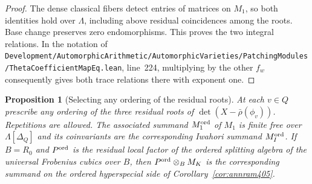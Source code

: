 \documentclass[a4paper,11pt]{article}
\newtheorem{proposition}{Proposition}[section]
\theoremstyle{definition}
\theoremstyle{remark}
\newcommand{\srcloc}[2]{{\small\nolinkurl{#1.lean}}, line~#2}
\numberwithin{equation}{section}
\begin{document}
\begin{proof}
The dense classical fibers detect entries of matrices on
\(M_1\), so both identities hold over \(\Lambda\), including
above residual coincidences among the roots. Base change
preserves zero endomorphisms. This proves the two integral
relations. In the notation of
\srcloc{Development/AutomorphicArithmetic/AutomorphicVarieties/PatchingModules/ThetaCoefficientMapEq}{224},
multiplying by the other \(f_w\) consequently gives both
trace relations there with exponent one.
\end{proof}

\begin{proposition}[Selecting any ordering of the residual roots]\leavevmode
\label{prop:orderedpiece406}
At each \(v\in Q\) prescribe any ordering of the three
residual roots of \(\det(X-\bar\rho(\phi_v))\). Repetitions
are allowed. The associated summand \(M_1^{\rm ord}\) of
\(M_1\) is finite free over \(\Lambda[\Delta_Q]\) and its
coinvariants are the corresponding Iwahori summand
\(M_I^{\rm ord}\). If \(B=R_0\) and \(P^{\rm ord}\) is the
residual local factor of the ordered splitting algebra of
the universal Frobenius cubics over \(B\), then
\(P^{\rm ord}\otimes_B M_K\) is the corresponding summand
on the ordered hyperspecial side of Corollary~\ref{cor:annram405}.
\end{proposition}
\end{document}
